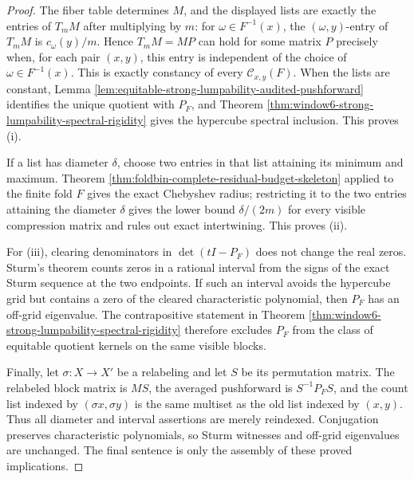 \begin{proof}
The fiber table determines \(M\), and the displayed lists are exactly the entries of \(T_mM\) after multiplying by \(m\): for \(\omega\in F^{-1}(x)\), the \((\omega,y)\)-entry of \(T_mM\) is \(c_\omega(y)/m\).  Hence \(T_mM=MP\) can hold for some matrix \(P\) precisely when, for each pair \((x,y)\), this entry is independent of the choice of \(\omega\in F^{-1}(x)\).  This is exactly constancy of every \(\mathcal C_{x,y}(F)\).  When the lists are constant, Lemma \ref{lem:equitable-strong-lumpability-audited-pushforward} identifies the unique quotient with \(P_F\), and Theorem \ref{thm:window6-strong-lumpability-spectral-rigidity} gives the hypercube spectral inclusion.  This proves \textup{(i)}.

If a list has diameter \(\delta\), choose two entries in that list attaining its minimum and maximum.  Theorem \ref{thm:foldbin-complete-residual-budget-skeleton} applied to the finite fold \(F\) gives the exact Chebyshev radius; restricting it to the two entries attaining the diameter \(\delta\) gives the lower bound \(\delta/(2m)\) for every visible compression matrix and rules out exact intertwining.  This proves \textup{(ii)}.

For \textup{(iii)}, clearing denominators in \(\det(tI-P_F)\) does not change the real zeros.  Sturm's theorem counts zeros in a rational interval from the signs of the exact Sturm sequence at the two endpoints.  If such an interval avoids the hypercube grid but contains a zero of the cleared characteristic polynomial, then \(P_F\) has an off-grid eigenvalue.  The contrapositive statement in Theorem \ref{thm:window6-strong-lumpability-spectral-rigidity} therefore excludes \(P_F\) from the class of equitable quotient kernels on the same visible blocks.

Finally, let \(\sigma:X\to X'\) be a relabeling and let \(S\) be its permutation matrix.  The relabeled block matrix is \(MS\), the averaged pushforward is \(S^{-1}P_FS\), and the count list indexed by \((\sigma x,\sigma y)\) is the same multiset as the old list indexed by \((x,y)\).  Thus all diameter and interval assertions are merely reindexed.  Conjugation preserves characteristic polynomials, so Sturm witnesses and off-grid eigenvalues are unchanged.  The final sentence is only the assembly of these proved implications. \qedhere
\end{proof}


